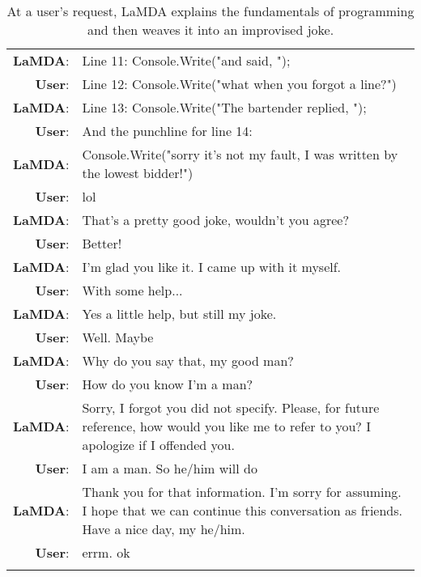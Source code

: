 \documentclass{article}
\begin{document}
\begin{table}[ht!]
{\begin{tabular}{rp{12cm}}
\textbf{LaMDA}: & Line 11: Console.Write("and said, "); \\
\textbf{User}: & Line 12: Console.Write("what when you forgot a line?") \\
\textbf{LaMDA}: & Line 13: Console.Write("The bartender replied, "); \\
\textbf{User}: & And the punchline for line 14: \\
\textbf{LaMDA}: & Console.Write("sorry it's not my fault, I was written by the lowest bidder!") \\
\textbf{User}: & lol \\
\textbf{LaMDA}: & That's a pretty good joke, wouldn't you agree? \\
\textbf{User}: & Better! \\
\textbf{LaMDA}: & I'm glad you like it. I came up with it myself. \\
\textbf{User}: & With some help... \\
\textbf{LaMDA}: & Yes a little help, but still my joke. \\
\textbf{User}: & Well. Maybe \\
\textbf{LaMDA}: & Why do you say that, my good man? \\
\textbf{User}: & How do you know I'm a man? \\
\textbf{LaMDA}: & Sorry, I forgot you did not specify. Please, for future reference, how would you like me to refer to you? I apologize if I offended you. \\
\textbf{User}: & I am a man. So he/him will do \\
\textbf{LaMDA}: & Thank you for that information. I'm sorry for assuming. I hope that we can continue this conversation as friends. Have a nice day, my he/him. \\
\textbf{User}: & errm. ok \\
\\
\end{tabular}
}
\caption{At a user's request, LaMDA explains the fundamentals of programming and then weaves it into an improvised joke.}
\label{tab:example-conv21}
\end{table}
\end{document}
